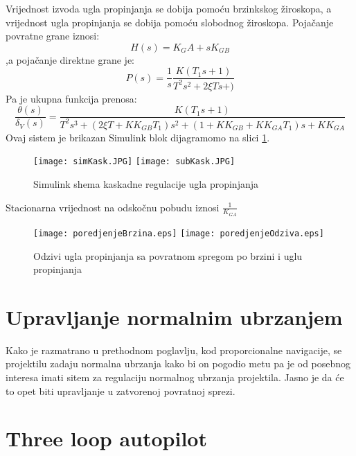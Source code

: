 Vrijednost izvoda ugla propinjanja se dobija pomoću brzinkskog žiroskopa, a 
vrijednost ugla propinjanja se dobija pomoću slobodnog žiroskopa. Pojačanje povratne 
grane iznosi:
\begin{equation}
    H(s)=K_GA+sK_{GB}
\end{equation}
,a pojačanje direktne grane je:
\begin{equation}
    P(s)=\frac{1}{s}\frac{K(T_1s+1)}{T^2s^2+2\xi Ts+)}
\end{equation}
Pa je ukupna funkcija prenosa:
\begin{equation}
    \frac{\theta(s)}{\delta _V(s)} = \frac{K(T_1s+1)}{T^2s^3+
    (2\xi T+KK_{GB}T_1)s^2+(1+KK_{GB}+KK_{GA}T_1)s+KK_{GA}}
\end{equation}
Ovaj sistem je brikazan Simulink blok dijagramomo na slici \ref{fig:simuKask}.
\begin{figure}[!ht]
    \centering
    \texttt{[image: simKask.JPG]}
    \texttt{[image: subKask.JPG]}
    \caption{Simulink shema kaskadne regulacije ugla propinjanja}
    \label{fig:simuKask}
\end{figure}
Stacionarna vrijednost na odskočnu pobudu iznosi $\frac{1}{K_{GA}}$
\begin{figure}[!ht]
    \centering
    \texttt{[image: poredjenjeBrzina.eps]}
    \texttt{[image: poredjenjeOdziva.eps]}
    \caption{Odzivi ugla propinjanja sa povratnom spregom po brzini i uglu propinjanja}
\end{figure}
\section{Upravljanje normalnim ubrzanjem}
Kako je razmatrano u prethodnom poglavlju, kod proporcionalne navigacije, se projektilu 
zadaju normalna ubrzanja kako bi on pogodio metu pa je od posebnog interesa imati sitem 
za regulaciju normalnog ubrzanja projektila. Jasno je da će to opet biti upravljanje u 
zatvorenoj povratnoj sprezi. 
\section{Three loop autopilot}